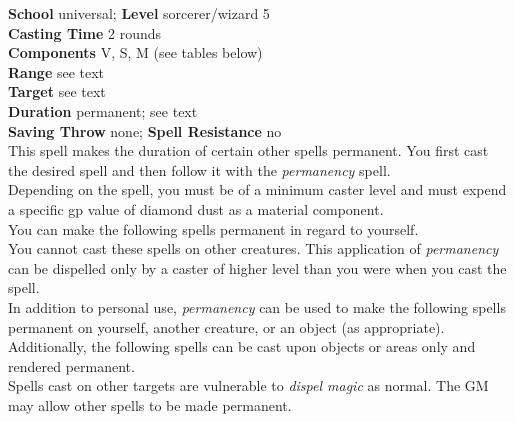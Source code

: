\textbf{School} universal; \textbf{Level} sorcerer/wizard 5\\
\textbf{Casting Time} 2 rounds\\
\textbf{Components} V, S, M (see tables below)\\
\textbf{Range} see text\\
\textbf{Target }see text\\
\textbf{Duration} permanent; see text\\
\textbf{Saving Throw} none; \textbf{Spell Resistance} no\\
This spell makes the duration of certain other spells permanent. You first cast the desired spell and then follow it with the \textit{permanency }spell. \\
Depending on the spell, you must be of a minimum caster level and must expend a specific gp value of diamond dust as a material component.\\
You can make the following spells permanent in regard to yourself.\\
You cannot cast these spells on other creatures. This application of \textit{permanency }can be dispelled only by a caster of higher level than you were when you cast the spell.\\
In addition to personal use, \textit{permanency }can be used to make the following spells permanent on yourself, another creature, or an object (as appropriate).\\
Additionally, the following spells can be cast upon objects or areas only and rendered permanent.\\
Spells cast on other targets are vulnerable to \textit{dispel magic }as normal. The GM may allow other spells to be made permanent.\\
